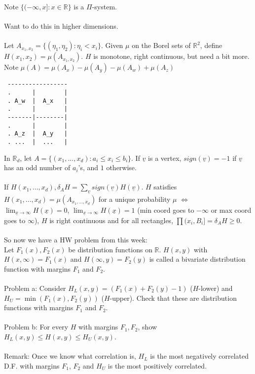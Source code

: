 \documentclass[12pt]{article}
\begin{document}
Note $\{(-\infty, x]: x \in \mathbb{R}\}$ is a $\Pi$-system.
\\ \\
Want to do this in higher dimensions.
\\ \\
Let $A_{x_1, x_2} = \{ (\eta_1, \eta_2) : \eta_i < x_i \}$.  Given $\mu$ on the Borel sets of $\mathbb{R}^2$, define $H(x_1, x_2) = \mu(A_{x_1, x_2})$.  $H$ is monotone, right continuous, but need a bit more.  Note $\mu(A) = \mu(A_x) - \mu(A_y) - \mu(A_w) + \mu(A_z)$
\begin{verbatim}
 -----------------
 .      |        |
 . A_w  |  A_x   |
 .      |        |
 -------|--------|
 .      |        |
 . A_z  |  A_y   |
 . ...  |  ...   |

\end{verbatim}
In $\mathbb{R}_d$, let $A = \{(x_1, ..., x_d) : a_i \le x_i \le b_i\}$.  If $\underline{v}$ is a vertex, $sign(\underline{v}) = -1$ if $\underline{v}$ has an odd number of $a_i$'s, and $1$ otherwise.
\\ \\
If $H(x_1, ..., x_d), \delta_A H = \sum_{\underline{v}} sign(\underline{v}) H(\underline{v})$.  $H$ satisfies $H(x_1, ..., x_d) = \mu(A_{x_1, ..., x_d})$ for a unique probability $\mu$ $\Leftrightarrow$ $\lim_{\underline{x} \to \infty} H(\underline{x}) = 0$, $\lim_{\underline{x} \to \infty} H(\underline{x}) = 1$ (min coord goes to $-\infty$ or max coord goes to $\infty$), $H$ is right continuous and for all rectangles, $\prod(x_i, B_i] = \delta_A H \ge 0$.
\\ \\
So now we have a HW problem from this week: \\Let $F_1(x), F_2(x)$ be distribution functions on $\mathbb{R}$.  $H(x,y)$ with $H(x, \infty) = F_1(x)$ and $H(\infty, y) = F_2(y)$ is called a bivariate distribution function with margins $F_1$ and $F_2$.
\\ \\
Problem a: Consider $H_L(x, y) = (F_1(x) + F_2(y) - 1)$ ($H$-lower) and $H_U = \min(F_1(x), F_2(y))$ ($H$-upper).  Check that these are distribution functions with margins $F_1$ and $F_2$.
\\ \\
Problem b: For every $H$ with margins $F_1, F_2$, show $H_L(x,y) \le H(x,y) \le H_U(x,y)$.
\\ \\
Remark: Once we know what correlation is, $H_L$ is the most negatively correlated D.F. with margins $F_1$, $F_2$ and $H_U$ is the most positively correlated.
\\ \\
\end{document}
